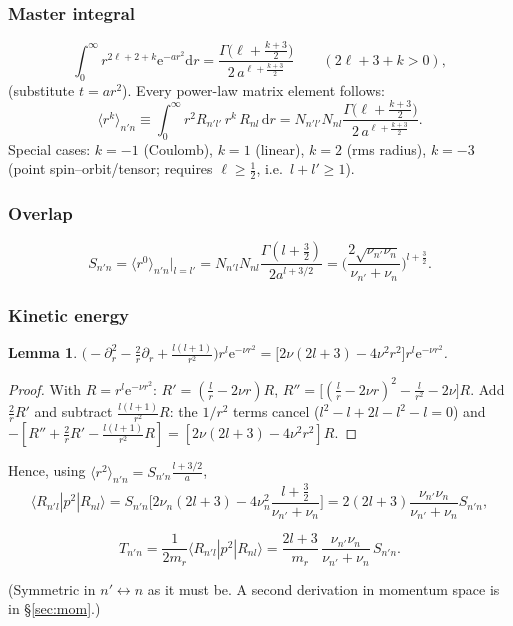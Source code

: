 \documentclass[11pt,a4paper]{article}
\numberwithin{equation}{section}
\theoremstyle{definition}
\theoremstyle{plain}
\newtheorem{lemma}[definition]{Lemma}
\theoremstyle{remark}
\newenvironment{keyresult}[1][Key result]{\begin{tcolorbox}[keybox,title={\small\bfseries #1},fonttitle=\small,coltitle=white,colbacktitle=MidnightBlue!70]}{\end{tcolorbox}}
\numberwithin{algorithm}{section}
\newcommand{\dd}{\mathrm{d}}
\newcommand{\ee}{\mathrm{e}}
\newcommand{\mr}{m_r}
\newcommand{\ME}[3]{\langle #1|#2|#3\rangle}
\begin{document}
\subsubsection{Master integral}
\begin{equation}
\int_0^\infty r^{2\ell+2+k}\ee^{-ar^2}\dd r=\frac{\Gamma\!\big(\ell+\frac{k+3}2\big)}{2\,a^{\ell+\frac{k+3}2}}\qquad(2\ell+3+k>0),
\label{eq:master}
\end{equation}
(substitute $t=ar^2$). Every power-law matrix element follows:
\begin{equation}
\langle r^k\rangle_{n'n}\equiv\int_0^\infty r^2R_{n'l'}\,r^k\,R_{nl}\,\dd r=N_{n'l'}N_{nl}\frac{\Gamma\!\big(\ell+\frac{k+3}2\big)}{2\,a^{\ell+\frac{k+3}2}} .
\end{equation}
Special cases: $k=-1$ (Coulomb), $k=1$ (linear), $k=2$ (rms radius), $k=-3$ (point spin--orbit/tensor; requires $\ell\ge\frac12$, i.e.\ $l+l'\ge1$).

\subsubsection{Overlap}
\begin{equation}
S_{n'n}=\langle r^0\rangle_{n'n}\Big|_{l=l'}=N_{n'l}N_{nl}\frac{\Gamma(l+\frac32)}{2a^{l+3/2}}=\Big(\frac{2\sqrt{\nu_{n'}\nu_n}}{\nu_{n'}+\nu_n}\Big)^{l+\frac32}.
\end{equation}

\subsubsection{Kinetic energy}
\begin{lemma}
$\Big(-\partial_r^2-\frac2r\partial_r+\frac{l(l+1)}{r^2}\Big)r^l\ee^{-\nu r^2}=\big[2\nu(2l+3)-4\nu^2r^2\big]r^l\ee^{-\nu r^2}$.
\end{lemma}
\begin{proof}
With $R=r^l\ee^{-\nu r^2}$: $R'=(\frac lr-2\nu r)R$, $R''=\big[(\frac lr-2\nu r)^2-\frac{l}{r^2}-2\nu\big]R$. Add $\frac2rR'$ and subtract $\frac{l(l+1)}{r^2}R$: the $1/r^2$ terms cancel ($l^2-l+2l-l^2-l=0$) and $-[R''+\frac2rR'-\frac{l(l+1)}{r^2}R]=[2\nu(2l+3)-4\nu^2r^2]R$.
\end{proof}
Hence, using $\langle r^2\rangle_{n'n}=S_{n'n}\frac{l+3/2}{a}$,
\begin{equation}
\ME{R_{n'l}}{p^2}{R_{nl}}=S_{n'n}\Big[2\nu_n(2l+3)-4\nu_n^2\frac{l+\frac32}{\nu_{n'}+\nu_n}\Big]=2(2l+3)\frac{\nu_{n'}\nu_n}{\nu_{n'}+\nu_n}S_{n'n},
\end{equation}
\begin{keyresult}[Non-relativistic kinetic matrix]
\begin{equation}
T_{n'n}=\frac{1}{2\mr}\ME{R_{n'l}}{p^2}{R_{nl}}=\frac{2l+3}{\mr}\,\frac{\nu_{n'}\nu_n}{\nu_{n'}+\nu_n}\,S_{n'n}.
\end{equation}
\end{keyresult}
(Symmetric in $n'\leftrightarrow n$ as it must be. A second derivation in momentum space is in \S\ref{sec:mom}.)
\end{document}
